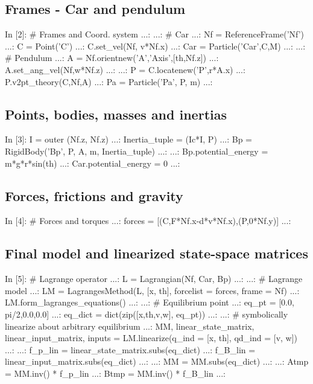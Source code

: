 \subsection{Frames - Car and pendulum}
\begin{code}
In [2]: # Frames and Coord. system
   ...: 
   ...: # Car
   ...: Nf = ReferenceFrame('Nf')
   ...: C = Point('C')                         
   ...: C.set_vel(Nf, v*Nf.x)
   ...: Car = Particle('Car',C,M)
   ...: 
   ...: # Pendulum
   ...: A = Nf.orientnew('A','Axis',[th,Nf.z])
   ...: A.set_ang_vel(Nf,w*Nf.z)
   ...: 
   ...: P = C.locatenew('P',r*A.x)
   ...: P.v2pt_theory(C,Nf,A)
   ...: Pa = Particle('Pa', P, m)
   ...: 
\end{code}

\subsection{Points, bodies, masses and inertias}
\begin{code}
In [3]: I = outer (Nf.z, Nf.z)
   ...: Inertia_tuple = (Ic*I, P)
   ...: Bp = RigidBody('Bp', P, A, m, Inertia_tuple)
   ...: 
   ...: Bp.potential_energy = m*g*r*sin(th)
   ...: Car.potential_energy = 0
   ...: 
\end{code}

\subsection{Forces, frictions and gravity}
\begin{code}
In [4]: # Forces and torques
   ...: forces = [(C,F*Nf.x-d*v*Nf.x),(P,0*Nf.y)]
   ...: 
\end{code}

\subsection{Final model and linearized state-space matrices}
\begin{code}
In [5]: # Lagrange operator
   ...: L = Lagrangian(Nf, Car, Bp)
   ...: 
   ...: # Lagrange model
   ...: LM = LagrangesMethod(L, [x, th], forcelist = forces, frame = Nf)
   ...: LM.form_lagranges_equations()
   ...: 
   ...: # Equilibrium point
   ...: eq_pt = [0.0, pi/2,0.0,0.0]
   ...: eq_dict = dict(zip([x,th,v,w], eq_pt))
   ...: 
   ...: # symbolically linearize about arbitrary equilibrium
   ...: MM, linear_state_matrix, linear_input_matrix, inputs = LM.linearize(q_ind = [x, th], qd_ind = [v, w])
   ...: 
   ...: f_p_lin = linear_state_matrix.subs(eq_dict)
   ...: f_B_lin = linear_input_matrix.subs(eq_dict)
   ...: 
   ...: MM = MM.subs(eq_dict)
   ...: 
   ...: Atmp = MM.inv() * f_p_lin
   ...: Btmp = MM.inv() * f_B_lin
   ...: 
\end{code}

